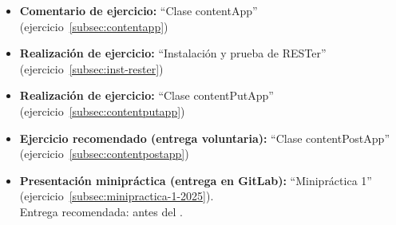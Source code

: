 \documentclass[a4paper,12pt]{article}
\begin{document}
\begin{itemize}
\item \textbf{Comentario de ejercicio:}  ``Clase contentApp'' (ejercicio~\ref{subsec:contentapp})
\item \textbf{Realización de ejercicio:}  ``Instalación y prueba de RESTer'' (ejercicio~\ref{subsec:inst-rester})
\item \textbf{Realización de ejercicio:}  ``Clase contentPutApp'' (ejercicio~\ref{subsec:contentputapp})
\item \textbf{Ejercicio recomendado (entrega voluntaria):} ``Clase contentPostApp'' (ejercicio~\ref{subsec:contentpostapp})
\item \textbf{Presentación minipráctica (entrega en GitLab):} ``Minipráctica 1'' (ejercicio~\ref{subsec:minipractica-1-2025}). \\
    Entrega recomendada: antes del \juevesH.
\end{itemize}



\end{document}
